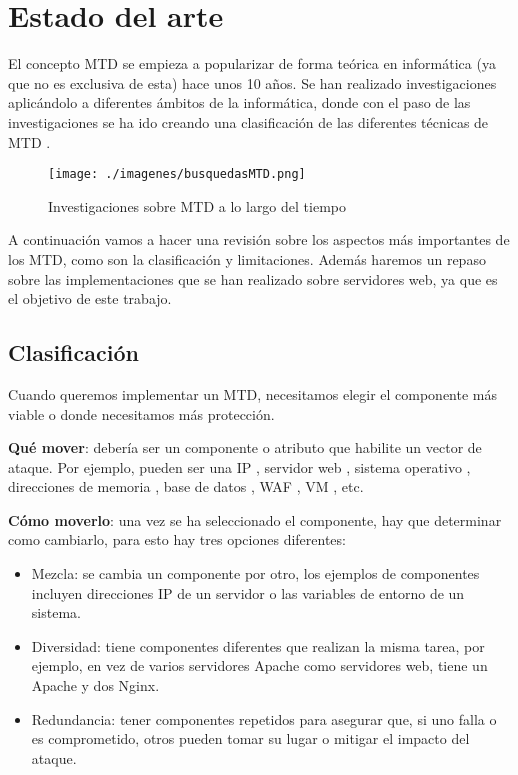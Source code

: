 \chapter{Estado del arte}

El concepto MTD se empieza a popularizar de forma teórica en informática (ya que no es exclusiva de esta) hace unos 10 años. Se han realizado investigaciones aplicándolo a diferentes ámbitos de la informática, donde con el paso de las investigaciones se ha ido creando una clasificación de las diferentes técnicas de MTD \cite{big-state-of-art}.
\begin{figure}[h]
    \centering
    \texttt{[image: ./imagenes/busquedasMTD.png]}
    \caption{Investigaciones sobre MTD a lo largo del tiempo\cite{mtd-results}}
\end{figure}

A continuación vamos a hacer una revisión sobre los aspectos más importantes de los MTD, como son la clasificación y limitaciones. Además haremos un repaso sobre las implementaciones que se han realizado sobre servidores web, ya que es el objetivo de este trabajo.

\section{Clasificación}
Cuando queremos implementar un MTD, necesitamos elegir el componente más viable o donde necesitamos más protección.

\textbf{Qué mover}: debería ser un componente o atributo que habilite un vector de ataque. Por ejemplo, pueden ser una IP \cite{MTD-SDN+decoy}\cite{MTD-ipshuffling+honeypots}\cite{MTD-POC-empresa}, servidor web \cite{MTD-DARE}\cite{MTD-MORE+DARE+Java}, sistema operativo \cite{MTD-MORE+DARE+Java}, direcciones de memoria \cite{MTD-ASR}, base de datos \cite{MTD-arab}, WAF \cite{MTD-WAF}, VM \cite{MTD-POC-empresa}\cite{MTD-DARE}\cite{SCIT-base}, etc.

\textbf{Cómo moverlo}: una vez se ha seleccionado el componente, hay que determinar como cambiarlo, para esto hay tres opciones diferentes:
\begin{itemize}
    \item Mezcla: se cambia un componente por otro, los ejemplos de componentes incluyen direcciones IP de un servidor o las variables de entorno de un sistema.
    \item Diversidad: tiene componentes diferentes que realizan la misma tarea, por ejemplo, en vez de varios servidores Apache como servidores web, tiene un Apache y dos Nginx.
    \item Redundancia: tener componentes repetidos para asegurar que, si uno falla o es comprometido, otros pueden tomar su lugar o mitigar el impacto del ataque. 
\end{itemize}

